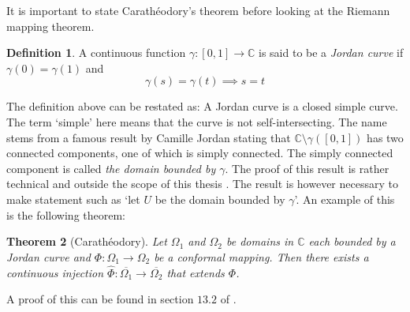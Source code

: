 \documentclass[a4paper,12pt,twoside,BCOR=10mm]{scrbook}
\newtheorem{theorem}{Theorem}[section]
\theoremstyle{definition}
\theoremstyle{definition}
\theoremstyle{definition}
\newtheorem{definition}[theorem]{Definition}
\begin{document}
It is important to state Carathéodory's theorem before looking at the Riemann mapping theorem.
\begin{definition}
A continuous function $\gamma: [0, 1] \rightarrow \mathbb{C}$ is said to be a \emph{Jordan curve} if $\gamma(0) = \gamma(1)$ and
\[
	\gamma(s) = \gamma(t) \implies s = t \tag*{for all $s, t \in ]0, 1[$.}
\]
\end{definition}
The definition above can be restated as: A Jordan curve is a closed simple curve.
The term `simple' here means that the curve is not self-intersecting.
The name stems from a famous result by Camille Jordan stating that $\mathbb{C} \setminus \gamma([0, 1])$ has two connected components, one of which is simply connected.
The simply connected component is called \emph{the domain bounded by $\gamma$}.
The proof of this result is rather technical and outside the scope of this thesis \citep{munkres, greenkrantz}.
The result is however necessary to make statement such as `let $U$ be the domain bounded by $\gamma$'.
An example of this is the following theorem:
\begin{theorem}[Carathéodory]
Let $\Omega_1$ and $\Omega_2$ be domains in $\mathbb{C}$ each bounded by a Jordan curve and $\Phi: \Omega_1 \rightarrow \Omega_2$ be a conformal mapping.
Then there exists a continuous injection $\hat{\Phi}: \overline{\Omega_1} \rightarrow \overline{\Omega_2}$ that extends $\Phi$.
\end{theorem}
A proof of this can be found in section $13.2$ of \citep{greenkrantz}.
\end{document}
